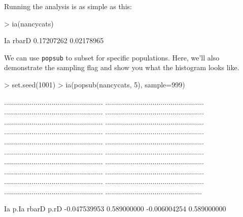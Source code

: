 \documentclass[letterpaper]{article}
\begin{document}
Running the analysis is as simple as this:
\begin{Schunk}
\begin{Sinput}
> ia(nancycats)
\end{Sinput}
\begin{Soutput}
        Ia      rbarD 
0.17207262 0.02178965 
\end{Soutput}
\end{Schunk}
We can use \texttt{popsub} to subset for specific populations. Here, we'll also demonstrate the sampling flag and show you what the histogram looks like.
\begin{Schunk}
\begin{Sinput}
> set.seed(1001)
> ia(popsub(nancycats, 5), sample=999)
\end{Sinput}
\end{Schunk}
\begin{Schunk}
\begin{Soutput}
..................................................
..................................................
..................................................
..................................................
..................................................
..................................................
..................................................
..................................................
..................................................
..................................................
..................................................
..................................................
..................................................
..................................................
..................................................
..................................................
..................................................
..................................................
..................................................
.................................................
\end{Soutput}
\begin{Soutput}
          Ia         p.Ia        rbarD         p.rD 
-0.047539953  0.589000000 -0.006004254  0.589000000 
\end{Soutput}
\end{Schunk}
\end{document}
